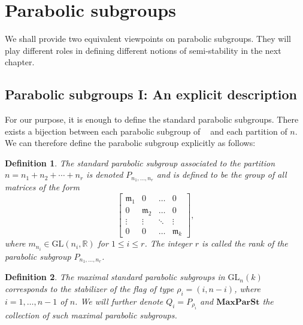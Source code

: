 \documentclass[12pt]{article} %
\newtheorem{definition}{Definition}[section]
\DeclareMathOperator{\SLn}{\text{SL}_n(\mathbb{R})}
\begin{document}
\section{Parabolic subgroups}
We shall provide two equivalent viewpoints on parabolic subgroups. They will play different roles in defining
different notions of semi-stability in the next chapter.
\subsection{Parabolic subgroups I: An explicit description }
For our purpose, it is enough to define the standard parabolic subgroups.  There exists a bijection between each parabolic subgroup of $\SLn$
and each partition of $n$. We can therefore define the parabolic subgroup explicitly as follows:
\begin{definition}
    The standard parabolic subgroup associated to the partition $n = n_1 + n_2 + \cdots + n_r$ is denoted $P_{n_1,\ldots,n_r}$ and is defined to be the group of all matrices of the form
    \[
        \begin{bmatrix}
            \mathfrak{m}_1 & 0              & \ldots & 0              \\
            0              & \mathfrak{m}_2 & \ldots & 0              \\
            \vdots         & \vdots         & \ddots & \vdots         \\
            0              & 0              & \ldots & \mathfrak{m}_k
        \end{bmatrix} ,
    \]
    where $m_{n_i} \in \mathrm{GL}(n_i, \mathbb{R})$ for $1 \leq i \leq r$. The integer $r$ is called the rank of the parabolic subgroup $P_{n_1,\ldots,n_r}$.
\end{definition}

\begin{definition}
    The maximal standard parabolic subgroups in $\text{GL}_n(k)$ corresponds to the
    stabilizer of the flag of type $\rho_i =(i,n-i)$, where $i = 1,\ldots,n-1$ of $n$. We will
    further denote $Q_i = P_{\rho_i}$ and $\textbf{MaxParSt}$ the collection of such maximal parabolic subgroups.
\end{definition}
\end{document}
